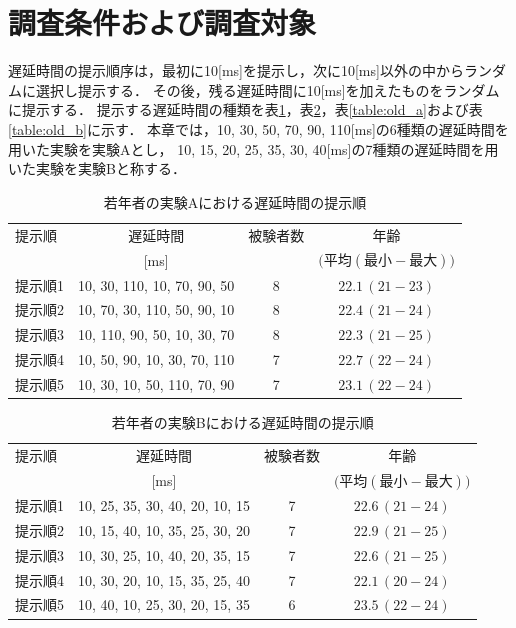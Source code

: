 \section{調査条件および調査対象}
遅延時間の提示順序は，最初に10[ms]を提示し，次に10[ms]以外の中からランダムに選択し提示する．
その後，残る遅延時間に10[ms]を加えたものをランダムに提示する．
提示する遅延時間の種類を表\ref{table:young_a}，表\ref{table:young_b}，表\ref{table:old_a}および表\ref{table:old_b}に示す．
本章では，10, 30, 50, 70, 90, 110[ms]の6種類の遅延時間を用いた実験を実験Aとし，
10, 15, 20, 25, 35, 30, 40[ms]の7種類の遅延時間を用いた実験を実験Bと称する．
\begin{table}[tbp]
  \caption{若年者の実験Aにおける遅延時間の提示順}
  \label{table:young_a}
  \centering
  \begin{tabular}{lccc}
    \hline
    提示順 & 遅延時間 & 被験者数 & 年齢\\
    　& [ms] & & $\bigl(平均 (最小-最大)\bigr)$\\
    \hline \hline
    提示順1  & 10, 30, 110, 10, 70, 90, 50  & 8 & $22.1\, (21-23)$\\
    提示順2  & 10, 70, 30, 110, 50, 90, 10  & 8 & $22.4\, (21-24)$\\
    提示順3  & 10, 110, 90, 50, 10, 30, 70  & 8 & $22.3\, (21-25)$\\
    提示順4  & 10, 50, 90, 10, 30, 70, 110  & 7 & $22.7\, (22-24)$\\
    提示順5  & 10, 30, 10, 50, 110, 70, 90  & 7 & $23.1\, (22-24)$
\\
    \hline
  \end{tabular}
\end{table}
\begin{table}[tbp]
  \caption{若年者の実験Bにおける遅延時間の提示順}
  \label{table:young_b}
  \centering
  \begin{tabular}{lccc}
    \hline
    提示順 & 遅延時間 & 被験者数 & 年齢\\
    　& [ms] & & $\bigl(平均 (最小-最大)\bigr)$\\
    \hline \hline
    提示順1  & 10, 25, 35, 30, 40, 20, 10, 15  & 7 & $22.6\,(21-24)$\\
    提示順2  & 10, 15, 40, 10, 35, 25, 30, 20  & 7 & $22.9\,(21-25)$\\
    提示順3  & 10, 30, 25, 10, 40, 20, 35, 15  & 7 & $22.6\,(21-25)$\\
    提示順4  & 10, 30, 20, 10, 15, 35, 25, 40  & 7 & $22.1\,(20-24)$\\
    提示順5  & 10, 40, 10, 25, 30, 20, 15, 35  & 6 & $23.5\,(22-24)$
\\
    \hline
  \end{tabular}
\end{table}
